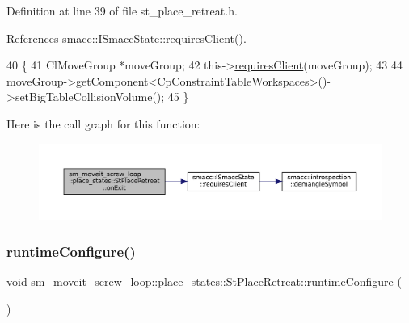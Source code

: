 Definition at line 39 of file st\+\_\+place\+\_\+retreat.\+h.



References smacc\+::\+I\+Smacc\+State\+::requires\+Client().


\begin{DoxyCode}
40             \{
41                 ClMoveGroup *moveGroup;
42                 this->\hyperlink{classsmacc_1_1ISmaccState_a7f95c9f0a6ea2d6f18d1aec0519de4ac}{requiresClient}(moveGroup);
43 
44                 moveGroup->getComponent<CpConstraintTableWorkspaces>()->setBigTableCollisionVolume();
45             \}
\end{DoxyCode}
Here is the call graph for this function\+:
\nopagebreak
\begin{figure}[H]
\begin{center}
\leavevmode
\includegraphics[width=350pt]{structsm__moveit__screw__loop_1_1place__states_1_1StPlaceRetreat_a14f697586afa2be8f3654928f8f492e1_cgraph}
\end{center}
\end{figure}
\mbox{\label{structsm__moveit__screw__loop_1_1place__states_1_1StPlaceRetreat_a74e966563a375d884f40641e85483e99}} 
\subsubsection{\texorpdfstring{runtime\+Configure()}{runtimeConfigure()}}
{\footnotesize\ttfamily void sm\+\_\+moveit\+\_\+screw\+\_\+loop\+::place\+\_\+states\+::\+St\+Place\+Retreat\+::runtime\+Configure (\begin{DoxyParamCaption}{ }\end{DoxyParamCaption})\hspace{0.3cm}{\ttfamily [inline]}}



